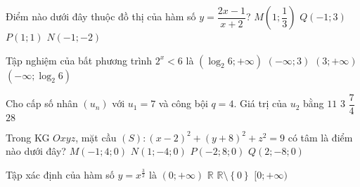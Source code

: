 \begin{ex}%
	Điểm nào dưới đây thuộc đồ thị của hàm số $y = \dfrac{2x - 1}{x + 2}$?
	\choice
	{\True $M\left( 1;\dfrac{1}{3} \right)$}
	{$Q(-1;3)$}
	{$P(1;1)$}
	{$N(-1;-2)$}
\end{ex}

\begin{ex}%
	Tập nghiệm của bất phương trình $2^x < 6$ là
	\choice
	{$(\log_{2}6; +\infty)$}
	{$(-\infty; 3)$}
	{$(3; + \infty)$}
	{\True $(-\infty; \log_{2}6)$}
\end{ex}

\begin{ex}%
	Cho cấp số nhân $(u_n)$ với $u_1 = 7$ và công bội $q = 4$. Giá trị của $u_2$ bằng
	\choice
	{$11$}
	{$3$}
	{$\dfrac{7}{4}$}
	{\True $28$}
\end{ex}

\begin{ex}%
	Trong KG $Oxyz$, mặt cầu $(S)\colon (x-2)^2 + (y+8)^2 + z^2 = 9$ có tâm là điểm nào dưới đây?
	\choice
	{$M(-1;4;0)$}
	{$N(1;-4;0)$}
	{$P(-2;8;0)$}
	{\True $Q(2;-8;0)$}
\end{ex}

\begin{ex}%
Tập xác định của hàm số $y = x^{\tfrac{3}{2}}$ là
	\choice
	{\True $(0;+\infty)$}
	{$\mathbb{R}$}
	{$\mathbb{R}\setminus \left\lbrace 0 \right\rbrace $}
	{$[0;+\infty)$}
\end{ex}



